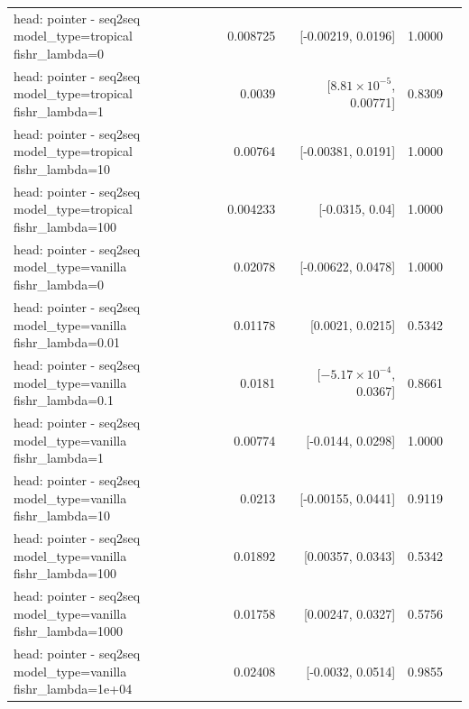 \documentclass[10pt]{article}
\makeatletter
\newcommand{\stackcell}[1]{\begin{tabular}[t]{@{}l@{}}#1\end{tabular}}
\makeatother
\begin{document}
{\begin{longtable}{lrrrl}
\stackcell{head: pointer - seq2seq\\\footnotesize model\_type=tropical fishr\_lambda=0 } & 0.008725 & [-0.00219, 0.0196] & 1.0000 & \\
\stackcell{head: pointer - seq2seq\\\footnotesize model\_type=tropical fishr\_lambda=1 } & 0.0039 & [$8.81\times10^{-5}$, 0.00771] & 0.8309 & \\
\stackcell{head: pointer - seq2seq\\\footnotesize model\_type=tropical fishr\_lambda=10 } & 0.00764 & [-0.00381, 0.0191] & 1.0000 & \\
\stackcell{head: pointer - seq2seq\\\footnotesize model\_type=tropical fishr\_lambda=100 } & 0.004233 & [-0.0315, 0.04] & 1.0000 & \\
\stackcell{head: pointer - seq2seq\\\footnotesize model\_type=vanilla fishr\_lambda=0 } & 0.02078 & [-0.00622, 0.0478] & 1.0000 & \\
\stackcell{head: pointer - seq2seq\\\footnotesize model\_type=vanilla fishr\_lambda=0.01 } & 0.01178 & [0.0021, 0.0215] & 0.5342 & \\
\stackcell{head: pointer - seq2seq\\\footnotesize model\_type=vanilla fishr\_lambda=0.1 } & 0.0181 & [$-5.17\times10^{-4}$, 0.0367] & 0.8661 & \\
\stackcell{head: pointer - seq2seq\\\footnotesize model\_type=vanilla fishr\_lambda=1 } & 0.00774 & [-0.0144, 0.0298] & 1.0000 & \\
\stackcell{head: pointer - seq2seq\\\footnotesize model\_type=vanilla fishr\_lambda=10 } & 0.0213 & [-0.00155, 0.0441] & 0.9119 & \\
\stackcell{head: pointer - seq2seq\\\footnotesize model\_type=vanilla fishr\_lambda=100 } & 0.01892 & [0.00357, 0.0343] & 0.5342 & \\
\stackcell{head: pointer - seq2seq\\\footnotesize model\_type=vanilla fishr\_lambda=1000 } & 0.01758 & [0.00247, 0.0327] & 0.5756 & \\
\stackcell{head: pointer - seq2seq\\\footnotesize model\_type=vanilla fishr\_lambda=1e+04 } & 0.02408 & [-0.0032, 0.0514] & 0.9855 & \\
\bottomrule
\end{longtable}
}
\end{document}
